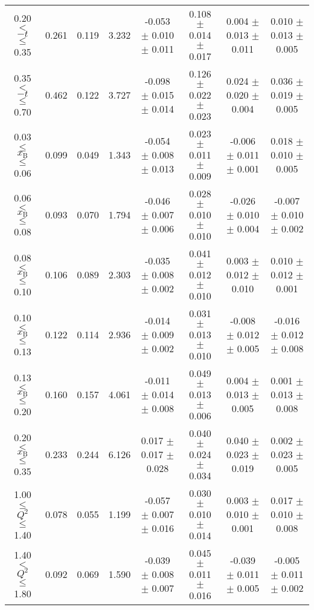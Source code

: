 \begin{table}[width=15cm]
\begin{center}
{\begin{tabular}{|c|c|c|c|c|c|c|c|}
0.20 $<$ $-t$ $\leqslant$ 0.35 &   0.261 & 0.119 &  3.232 &  -0.053 $\pm$   0.010  $\pm$  0.011 &
0.108 $\pm$  0.014  $\pm$ 0.017 & 0.004 $\pm$   0.013  $\pm$  0.011 & 0.010  $\pm$   0.013   $\pm$   0.005\\
0.35 $<$ $-t$ $\leqslant$ 0.70 &  0.462 & 0.122 &  3.727 &  -0.098  $\pm$  0.015  $\pm$   0.014 & 
0.126 $\pm$  0.022  $\pm$   0.023 & 0.024 $\pm$   0.020  $\pm$  0.004 & 0.036   $\pm$  0.019   $\pm$ 0.005\\
\hline
0.03 $\leqslant$ $x_{\textrm{B}}$ $\leqslant$ 0.06 &  0.099 &  0.049 &   1.343 &  -0.054  $\pm$  0.008  $\pm$   0.013 & 
0.023  $\pm$  0.011  $\pm$   0.009 & -0.006 $\pm$  0.011 $\pm$  0.001 &  0.018   $\pm$  0.010  $\pm$    0.005\\
0.06 $<$ $x_{\textrm{B}}$ $\leqslant$ 0.08 & 0.093  & 0.070 & 1.794  &   -0.046  $\pm$  0.007  $\pm$   0.006 &
0.028  $\pm$  0.010  $\pm$   0.010 & -0.026  $\pm$ 0.010  $\pm$  0.004 & -0.007   $\pm$  0.010   $\pm$   0.002\\
0.08 $<$ $x_{\textrm{B}}$ $\leqslant$ 0.10 &  0.106 & 0.089 &  2.303 &  -0.035  $\pm$  0.008  $\pm$   0.002 & 
0.041  $\pm$  0.012  $\pm$   0.010 & 0.003 $\pm$  0.012 $\pm$    0.010 & 0.010   $\pm$  0.012    $\pm$  0.001\\
0.10 $<$ $x_{\textrm{B}}$ $\leqslant$ 0.13 &  0.122 & 0.114  & 2.936  &  -0.014  $\pm$  0.009  $\pm$   0.002 & 
0.031  $\pm$  0.013 $\pm$   0.010 & -0.008 $\pm$  0.012  $\pm$   0.005 & -0.016   $\pm$  0.012  $\pm$    0.008\\
0.13 $<$ $x_{\textrm{B}}$ $\leqslant$ 0.20 &  0.160 & 0.157 & 4.061 &   -0.011   $\pm$ 0.014  $\pm$   0.008 & 
0.049  $\pm$  0.013 $\pm$    0.006 & 0.004  $\pm$  0.013  $\pm$   0.005 & 0.001   $\pm$  0.013   $\pm$  0.008\\
0.20 $<$ $x_{\textrm{B}}$ $\leqslant$ 0.35 & 0.233  & 0.244 &  6.126 &  0.017 $\pm$  0.017   $\pm$  0.028 & 
0.040  $\pm$  0.024   $\pm$  0.034 & 0.040  $\pm$  0.023  $\pm$   0.019 & 0.002  $\pm$   0.023  $\pm$   0.005\\
\hline
1.00 $\leqslant$ $Q^{2}$ $\leqslant$ 1.40 &  0.078 &  0.055 & 1.199 &  -0.057  $\pm$  0.007  $\pm$   0.016 & 
0.030  $\pm$  0.010  $\pm$   0.014 &  0.003 $\pm$  0.010  $\pm$  0.001 & 0.017  $\pm$  0.010   $\pm$   0.008\\
1.40 $<$ $Q^{2}$ $\leqslant$ 1.80 & 0.092  & 0.069 &  1.590 &  -0.039  $\pm$  0.008  $\pm$   0.007 & 
0.045  $\pm$  0.011  $\pm$   0.016 & -0.039  $\pm$  0.011  $\pm$  0.005 & -0.005  $\pm$  0.011   $\pm$  0.002\\

\end{tabular}}
\end{center}
\end{table}

